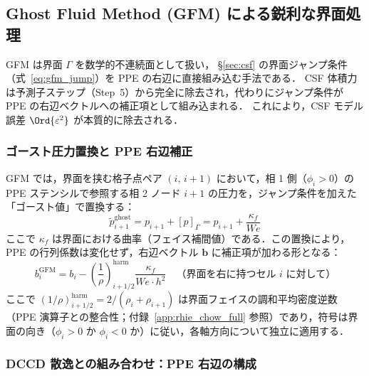 %
%
\subsection{Ghost Fluid Method (GFM) による鋭利な界面処理}
\label{sec:gfm}

GFM \cite{Fedkiw1999} は界面 $\Gamma$ を数学的不連続面として扱い，
§\ref{sec:csf} の界面ジャンプ条件（式~\eqref{eq:gfm_jump}）を PPE の右辺に直接組み込む手法である．
CSF 体積力は予測子ステップ（Step~5）から完全に除去され，代わりにジャンプ条件が PPE の右辺ベクトルへの補正項として組み込まれる．
これにより，CSF モデル誤差 $\Ord{\varepsilon^2}$ が本質的に除去される．

\subsubsection{ゴースト圧力置換と PPE 右辺補正}

GFM では，界面を挟む格子点ペア $(i,\,i+1)$ において，相 1 側（$\phi_i > 0$）の PPE ステンシルで参照する相 2 ノード $i+1$ の圧力を，ジャンプ条件を加えた「ゴースト値」で置換する：
\begin{equation}
  \tilde{p}_{i+1}^{\text{ghost}} = p_{i+1} + [p]_\Gamma = p_{i+1} + \frac{\kappa_f}{We}
  \label{eq:gfm_ghost_p}
\end{equation}
ここで $\kappa_f$ は界面における曲率（フェイス補間値）である．この置換により，PPE の行列係数は変化せず，右辺ベクトル $\mathbf{b}$ に補正項が加わる形となる：
\begin{equation}
  b_i^{\mathrm{GFM}} = b_i - \left(\frac{1}{\rho}\right)_{i+1/2}^{\!\mathrm{harm}} \frac{\kappa_f}{We \cdot h^2}
  \quad \text{（界面を右に持つセル $i$ に対して）}
  \label{eq:gfm_rhs_correction}
\end{equation}
ここで $(1/\rho)_{i+1/2}^{\mathrm{harm}} = 2/(\rho_i + \rho_{i+1})$ は界面フェイスの調和平均密度逆数（PPE 演算子との整合性；付録~\ref{app:rhie_chow_full} 参照）であり，符号は界面の向き（$\phi_i > 0$ か $\phi_i < 0$ か）に従い，各軸方向について独立に適用する．

\subsubsection{DCCD 散逸との組み合わせ：PPE 右辺の構成}

